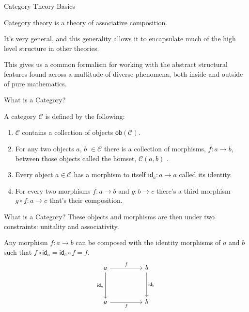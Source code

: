 \documentclass{beamer}
\begin{document}
\begin{frame}{Category Theory Basics}
    \begin{large}
        Category theory is a theory of associative composition.

        \vspace*{0.25in}
        It's very general, and this generality allows it to encapsulate much of the high level structure in other theories.

        \vspace*{0.25in}
        This gives us a common formalism for working with the abstract structural features found across a multitude of diverse phenomena, both inside and outside of pure mathematics.

    \end{large}

\end{frame}


\begin{frame}{What is a Category?}
    \begin{definition}[Category]
        A category $\mathcal{C}$ is defined by the following:
        \begin{enumerate}
            \item $\mathcal{C}$ contains a collection of objects $\mathsf{ob}(\mathcal{C})$.
            \item For any two objects $a$, $b$ $\in \mathcal{C}$ there is a collection of morphisms, $f:a \rightarrow b$, between those objects called the homset, $\mathcal{C}(a,b)$ .
            \item Every object $a\in \mathcal{C}$ has a morphism to itself $\mathsf{id}_a:a\rightarrow a$ called its identity.
            \item For every two morphisms $f:a\rightarrow b$ and $g: b\rightarrow c$ there's a third morphism $g\circ f:a\rightarrow c$ that's their composition.
        \end{enumerate}
    \end{definition}
\end{frame}


\begin{frame}[fragile]{What is a Category?}
    These objects and morphisms are then under two constraints: unitality and associativity.
    \begin{definition}
        Any morphism $f:a\rightarrow b$ can be composed with the identity morphisms of $a$ and $b$ such that $f\circ \mathsf{id}_a=\mathsf{id}_b\circ f=f$.
        \[\begin{tikzcd}
                a && b \\
                \\
                a && b
                \arrow["f", from=1-1, to=1-3]
                \arrow["{\mathsf{id}_a}"', from=1-1, to=3-1]
                \arrow["{\mathsf{id}_b}", from=1-3, to=3-3]
                \arrow["f"', from=3-1, to=3-3]
            \end{tikzcd}\]
    \end{definition}
\end{frame}
\end{document}
